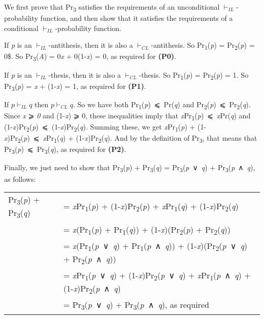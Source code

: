 \documentclass[
  10pt,
  letterpaper,
  DIV=11,
  numbers=noendperiod,
  twoside]{scrartcl}
\begin{document}
We first prove that Pr\textsubscript{3} satisfies the requirements of an
unconditional \(\vdash_{IL}\)-probability function, and then show that
it satisfies the requirements of a conditional
\(\vdash_{IL}\)-probability function.

If \emph{p} is an \(\vdash_{IL}\)-antithesis, then it is also a
\(\vdash_{CL}\)-antithesis. So Pr\textsubscript{1}(\emph{p}) =
Pr\textsubscript{2}(\emph{p}) = 0\$. So Pr\textsubscript{3}(\emph{A}) =
0\emph{x} + 0(1-\emph{x}) = 0, as required for \textbf{(P0)}.

If \emph{p} is an \(\vdash_{IL}\)-thesis, then it is also a
\(\vdash_{CL}\)-thesis. So Pr\textsubscript{1}(\emph{p}) =
Pr\textsubscript{2}(\emph{p}) = 1. So Pr\textsubscript{3}(\emph{p}) =
\emph{x} + (1-\emph{x}) = 1, as required for \textbf{(P1)}.

If \(p \vdash_{IL} q\) then \(p \vdash_{CL} q\). So we have both
Pr\textsubscript{1}(\emph{p})~⩽~Pr(\emph{q}) and
Pr\textsubscript{2}(\emph{p})~⩽~Pr\textsubscript{2}(\emph{q}). Since
\emph{x} ⩾ \emph{0} and (1-\emph{x}) ⩾ 0, these inequalities imply that
\emph{x}Pr\textsubscript{1}(\emph{p})~⩽~\emph{x}Pr(\emph{q}) and
(1-\emph{x})Pr\textsubscript{2}(\emph{p})~⩽~(1-\emph{x})Pr\textsubscript{2}(\emph{q}).
Summing these, we get \emph{x}Pr\textsubscript{1}(\emph{p}) +
(1-\emph{x})Pr\textsubscript{2}(\emph{p})~⩽~\emph{x}Pr\textsubscript{1}(\emph{q})
+ (1-\emph{x})Pr\textsubscript{2}(\emph{q}). And by the definition of
Pr\textsubscript{3}, that means that
Pr\textsubscript{3}(\emph{p})~⩽~Pr\textsubscript{3}(\emph{q}), as
required for \textbf{(P2)}.

Finally, we just need to show that Pr\textsubscript{3}(\emph{p}) +
Pr\textsubscript{3}(\emph{q}) = Pr\textsubscript{3}(\emph{p}~∨~\emph{q})
+ Pr\textsubscript{3}(\emph{p}~∧~\emph{q}), as follows:

\begin{longtable}[]{@{}
  >{\raggedleft\arraybackslash}p{}
  >{\raggedright\arraybackslash}p{}@{}}
\toprule\noalign{}
\endhead
\bottomrule\noalign{}
\endlastfoot
Pr\textsubscript{3}(\emph{p}) + Pr\textsubscript{3}(\emph{q}) & =
\emph{x}Pr\textsubscript{1}(\emph{p}) +
(1-\emph{x})Pr\textsubscript{2}(\emph{p}) +
\emph{x}Pr\textsubscript{1}(\emph{q}) +
(1-\emph{x})Pr\textsubscript{2}(\emph{q}) \\
& = \emph{x}(Pr\textsubscript{1}(\emph{p}) +
Pr\textsubscript{1}(\emph{q})) +
(1-\emph{x})(Pr\textsubscript{2}(\emph{p}) +
Pr\textsubscript{2}(\emph{q})) \\
& = \emph{x}(Pr\textsubscript{1}(\emph{p}~∨~\emph{q}) +
Pr\textsubscript{1}(\emph{p}~∧~\emph{q})) +
(1-\emph{x})(Pr\textsubscript{2}(\emph{p}~∨~\emph{q}) +
Pr\textsubscript{2}(\emph{p}~∧~\emph{q})) \\
& = \emph{x}Pr\textsubscript{1}(\emph{p}~∨~\emph{q}) +
(1-\emph{x})Pr\textsubscript{2}(\emph{p}~∨~\emph{q}) +
\emph{x}Pr\textsubscript{1}(\emph{p}~∧~\emph{q}) +
(1-\emph{x})Pr\textsubscript{2}(\emph{p}~∧~\emph{q}) \\
& = Pr\textsubscript{3}(\emph{p}~∨~\emph{q}) +
Pr\textsubscript{3}(\emph{p}~∧~\emph{q}), as required \\
\end{longtable}
\end{document}
